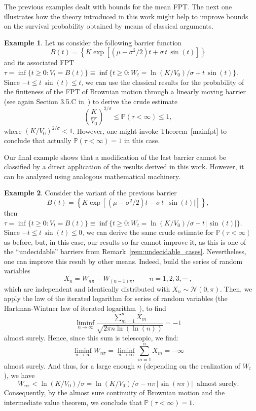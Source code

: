 \documentclass[12pt]{article}
\theoremstyle{definition}
\newtheorem{example}{Example}[theorem]
\begin{document}
The previous examples dealt with bounds for the mean FPT. The next one illustrates how the theory introduced in this work might help to improve bounds on the survival probability obtained by means of classical arguments.

\begin{example}
Let us consider the following barrier function
$$
B(t) = \left\{ K \exp \left[(\mu-\sigma^2/2)t + \sigma \, t \, \sin(t) \right] \right\}
$$
and its associated FPT $\tau=\inf \{t \ge 0 : V_t = B(t) \} \equiv \inf \{t \ge 0 : W_t = \ln(K/V_0)/\sigma + t \, \sin(t) \}.$
Since $-t \le t \, \sin(t) \le t$, we can use the classical results for the probability of the finiteness of the FPT of Brownian motion through a linearly moving barrier (see again Section 3.5.C in~\cite{karatzas1991brownian}) to derive the crude estimate
$$
\left(\frac{K}{V_0}\right)^{2/\sigma} \le \mathbb{P}(\tau < \infty) \le 1,
$$
where $(K/V_0)^{2/\sigma} < 1$. However, one might invoke Theorem~\ref{mainfpt} to conclude that actually $\mathbb{P}(\tau < \infty) = 1$ in this case.
\end{example}

Our final example shows that a modification of the last barrier cannot be classified by a direct application of the results derived in this work. However, it can be analyzed using analogous mathematical machinery.

\begin{example}\label{undecidible}
Consider the variant of the previous barrier
$$
B(t) = \left\{ K \exp \left[(\mu-\sigma^2/2)t - \sigma \, t \, |\sin(t)| \right] \right\},
$$
then
$\tau = \inf \{t \ge 0 : V_t = B(t) \}
\equiv \inf \{t \ge 0 : W_t = \ln(K/V_0)/\sigma - t \, |\sin(t)| \}.
$
Since $-t \le t \, \sin(t) \le 0$, we can derive the same crude estimate for $\mathbb{P}(\tau < \infty)$ as before, but, in this case, our results so far cannot improve it, as this is one of the ``undecidable'' barriers from Remark~\ref{rem:undecidable_cases}. Nevertheless, one can improve this result by other means. Indeed, build the series of random variables
$$
X_n= W_{n \pi}-W_{(n-1)\pi}, \qquad n=1,2,3,\cdots\;,
$$
which are independent and identically distributed with $X_n \sim \mathcal{N}(0,\pi)$. Then, we apply the law of the iterated logarithm for series of random variables (the Hartman-Wintner law of iterated logarithm~\cite{deAcosta1983,HartmanWintner1941}), to find
$$
\liminf_{n \to \infty} \frac{\sum_{m=1}^n X_m}{\sqrt{2 \pi n \ln(\ln(n))}}=-1
$$
almost surely. Hence, since this sum is telescopic, we find:
$$
\liminf_{n \to \infty} W_{n \pi} = \liminf_{n \to \infty} \sum_{m=1}^n X_m = - \infty
$$
almost surely. And thus, for a large enough $n$ (depending on the realization of $W_t$), we have
$$
W_{n \pi} < \ln(K/V_0)/\sigma = \ln(K/V_0)/\sigma - n \pi \, |\sin(n \pi)|\;\;\text{almost surely.}
$$
Consequently, by the almost sure continuity of Brownian motion and the intermediate value theorem, we conclude that $\mathbb{P}(\tau < \infty)=1$.
\end{example}
\end{document}
